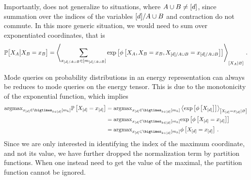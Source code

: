 Importantly,  does not generalize to situations, where $A\cup B\neq[d]$, since summation over the indices of the variables $[d]/A\cup B$ and contraction do not commute.
In this more generic situation, we would need to sum over exponentiated coordinates, that is
\begin{align*}
    \mathbb{P}\big[X_{A}\big|X_{B}=x_{B}\big]
    = \left\langle 
        \sum_{x_{[d]/A\cup B}\in[m_{[d]/A\cup B}]}
        \mathrm{exp}\left[\phi\left[X_{A},X_{B}=x_{B},X_{[d]/A\cup B}=x_{[d]/A\cup B}\right]\right]
    \right\rangle_{\left[ X_{A} | \varnothing \right]} \, .
\end{align*}


Mode queries on probability distributions in an energy representation can always be reduces to mode queries on the energy tensor.
This is due to the monotonicity of the exponential function, which implies
\begin{align*}
    \argmax_{\shortcatindicesin} \probat{\indexedshortcatvariables}
    &=\argmax_{\shortcatindicesin} \normalizationof{\expof{\energytensorwith}}{\indexedshortcatvariables} \\
    &=\argmax_{\shortcatindicesin} \expof{\energytensorat{\indexedshortcatvariables}} \\
    &=\argmax_{\shortcatindicesin} \energytensorat{\indexedshortcatvariables} \, .
\end{align*}
Since we are only interested in identifying the index of the maximum coordinate, and not its value, we have further dropped the normalization term by partition functions.
When one instead need to get the value of the maximal, the partition function cannot be ignored.